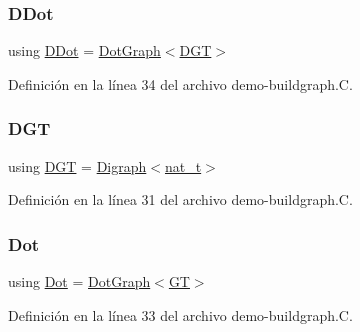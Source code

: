 \subsubsection{\texorpdfstring{D\+Dot}{DDot}}
{\footnotesize\ttfamily using \hyperlink{demo-buildgraph_8_c_a0ffdd103a7285712ccbd9548ff5544e7}{D\+Dot} =  \hyperlink{class_designar_1_1_dot_graph}{Dot\+Graph}$<$\hyperlink{demo-buildgraph_8_c_ae73e956c2a8cf0a58255aa6b659985e0}{D\+GT}$>$}



Definición en la línea 34 del archivo demo-\/buildgraph.\+C.

\mbox{\label{demo-buildgraph_8_c_ae73e956c2a8cf0a58255aa6b659985e0}} 
\subsubsection{\texorpdfstring{D\+GT}{DGT}}
{\footnotesize\ttfamily using \hyperlink{demo-buildgraph_8_c_ae73e956c2a8cf0a58255aa6b659985e0}{D\+GT} =  \hyperlink{class_designar_1_1_digraph}{Digraph}$<$\hyperlink{namespace_designar_aa72662848b9f4815e7bf31a7cf3e33d1}{nat\+\_\+t}$>$}



Definición en la línea 31 del archivo demo-\/buildgraph.\+C.

\mbox{\label{demo-buildgraph_8_c_a70657b0b48a4d69ef850be3c5517ecc2}} 
\subsubsection{\texorpdfstring{Dot}{Dot}}
{\footnotesize\ttfamily using \hyperlink{demo-buildgraph_8_c_a70657b0b48a4d69ef850be3c5517ecc2}{Dot} =  \hyperlink{class_designar_1_1_dot_graph}{Dot\+Graph}$<$\hyperlink{demo-buildgraph_8_c_a3001c40d2c31ca87ed96cd7d1334a55e}{GT}$>$}



Definición en la línea 33 del archivo demo-\/buildgraph.\+C.

\mbox{\label{demo-buildgraph_8_c_a3001c40d2c31ca87ed96cd7d1334a55e}} 
